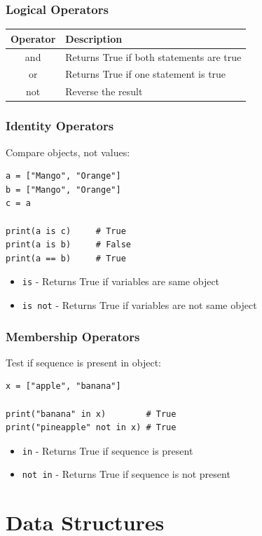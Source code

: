 \documentclass[aspectratio=169]{beamer}
\begin{document}
\begin{frame}
\frametitle{Logical Operators}
\begin{center}
\begin{tabular}{|c|l|}
\hline
\textbf{Operator} & \textbf{Description} \\
\hline
and & Returns True if both statements are true \\
or & Returns True if one statement is true \\
not & Reverse the result \\
\hline
\end{tabular}
\end{center}
\end{frame}

\begin{frame}[fragile]
\frametitle{Identity Operators}
Compare objects, not values:

\begin{lstlisting}
a = ["Mango", "Orange"]
b = ["Mango", "Orange"]
c = a

print(a is c)     # True
print(a is b)     # False
print(a == b)     # True
\end{lstlisting}

\begin{itemize}
\item \texttt{is} - Returns True if variables are same object
\item \texttt{is not} - Returns True if variables are not same object
\end{itemize}
\end{frame}

\begin{frame}[fragile]
\frametitle{Membership Operators}
Test if sequence is present in object:

\begin{lstlisting}
x = ["apple", "banana"]

print("banana" in x)        # True
print("pineapple" not in x) # True
\end{lstlisting}

\begin{itemize}
\item \texttt{in} - Returns True if sequence is present
\item \texttt{not in} - Returns True if sequence is not present
\end{itemize}
\end{frame}

\section{Data Structures}
\end{document}
